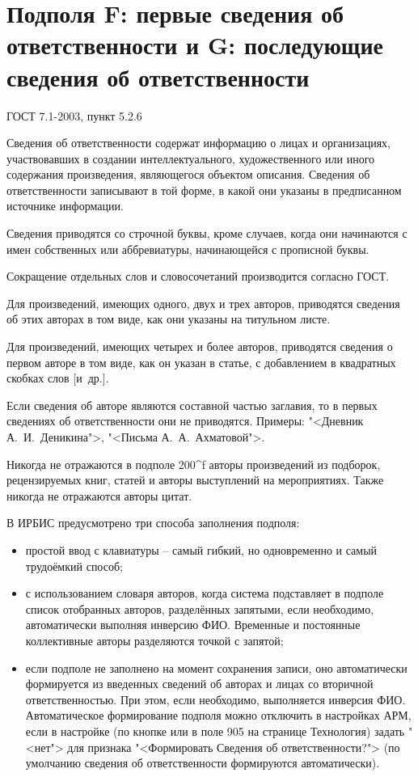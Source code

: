
\section{Подполя F: первые сведения об ответственности и G: последующие сведения об ответственности}

ГОСТ 7.1-2003, пункт 5.2.6 %

Сведения об ответственности содержат информацию о лицах и организациях, участвовавших в создании интеллектуального, художественного или иного содержания произведения, являющегося объектом описания. Сведения об ответственности записывают в той форме, в какой они указаны в предписанном источнике информации.

Сведения приводятся со строчной буквы, кроме случаев, когда они начинаются с имен собственных или аббревиатуры, начинающейся с прописной буквы.

Сокращение отдельных слов и словосочетаний производится согласно ГОСТ.

Для произведений, имеющих одного, двух и трех авторов, приводятся сведения об этих авторах в том виде, как они указаны на титульном листе.

Для произведений, имеющих четырех и более авторов, приводятся сведения о первом авторе в том виде, как он указан в статье, с добавлением в квадратных скобках слов [и~др.].

Если сведения об авторе являются составной частью заглавия, то в первых сведениях об ответственности они не приводятся. Примеры: "<Дневник А.~И.~Деникина">, "<Письма А.~А.~Ахматовой">.

Никогда не отражаются в подполе 200\^{}f авторы произведений из подборок, рецензируемых книг, статей и авторы выступлений на мероприятиях. Также никогда не отражаются авторы цитат.

В ИРБИС предусмотрено три способа заполнения подполя:

\vspace{-3mm}
\begin{itemize}
    \setlength\itemsep{-2mm}
	\item простой ввод с клавиатуры -- самый гибкий, но одновременно и самый трудоёмкий способ;
	\item с использованием словаря авторов, когда система подставляет в подполе список отобранных авторов, разделённых запятыми, если необходимо, автоматически выполняя инверсию ФИО. Временные и постоянные коллективные авторы разделяются точкой с запятой;
	\item если подполе не заполнено на момент сохранения записи, оно автоматически формируется из введенных сведений об авторах и лицах со вторичной ответственностью. При этом, если необходимо, выполняется инверсия ФИО. Автоматическое формирование подполя можно отключить в настройках АРМ, если в настройке (по кнопке или в поле 905 на странице Технология) задать "<нет"> для признака "<Формировать Сведения об ответственности?"> (по умолчанию сведения об ответственности формируются автоматически).
\end{itemize}

